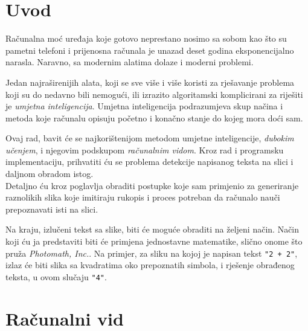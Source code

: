\section{Uvod}
Računalna moć uređaja koje gotovo neprestano nosimo sa sobom kao što su pametni telefoni i prijenosna računala je unazad deset godina eksponencijalno narasla. Naravno, sa modernim alatima dolaze i moderni problemi. 


Jedan najraširenijih alata, koji se sve više i više koristi za rješavanje problema koji su do nedavno bili nemogući, ili izrazito algoritamski komplicirani za riješiti je \emph{umjetna inteligencija}.
Umjetna inteligencija podrazumjeva skup načina i metoda koje računalu opisuju početno i konačno stanje do kojeg mora doći sam.


Ovaj rad, bavit će se najkorištenijom metodom umjetne inteligencije, \emph{dubokim učenjem}, i njegovim podskupom \emph{računalnim vidom}.
Kroz rad i programsku implementaciju, prihvatiti ću se problema detekcije napisanog teksta na slici i daljnom obradom istog. \\
Detaljno ću kroz poglavlja obraditi postupke koje sam primjenio za generiranje raznolikih slika koje imitiraju rukopis i proces potreban da računalo nauči prepoznavati isti na slici.


Na kraju, izlučeni tekst sa slike, biti će moguće obraditi na željeni način.
Način koji ću ja predstaviti biti će primjena jednostavne matematike, slično onome što pruža \emph{Photomath, Inc.}. 
Na primjer, za sliku na kojoj je napisan tekst \texttt{"2 + 2"}, izlaz će biti slika sa kvadratima oko prepoznatih simbola, i rješenje obrađenog teksta, u ovom slučaju \texttt{"4"}.

\section{Računalni vid}

